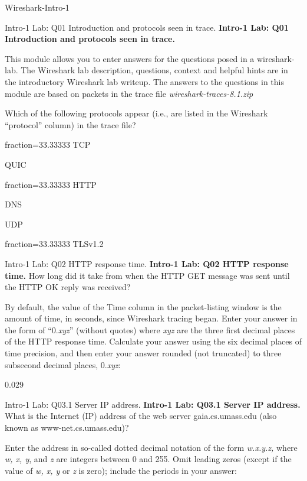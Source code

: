 \documentclass[a4paper]{article}
\begin{document}
\begin{quiz}{Wireshark-Intro-1}

\begin{multi}[points=1,multiple]{Intro-1 Lab: Q01 Introduction and protocols seen in trace.}
\textbf{Intro-1 Lab: Q01 Introduction and protocols seen in trace.}

This module allows you to enter answers for the questions posed in a wireshark-lab. The Wireshark lab description, questions, context and helpful hints are in the introductory Wireshark lab writeup. The answers to the questions in this module are based on packets in the trace file \emph{wireshark-traces-8.1.zip}

Which of the following protocols appear (i.e., are listed in the Wireshark ``protocol'' column) in the trace file? 

\item[fraction=33.33333] TCP
\item QUIC
\item[fraction=33.33333] HTTP
\item DNS
\item UDP
\item[fraction=33.33333] TLSv1.2
\end{multi}

\begin{shortanswer}[points=1]{Intro-1 Lab: Q02 HTTP response time.}
\textbf{Intro-1 Lab: Q02 HTTP response time.} 
How long did it take from when the HTTP GET message was sent until the HTTP OK reply was received? 

By default, the value of the Time column in the packet-listing window is the amount of time, in seconds, since Wireshark tracing began.  Enter your answer in the form of ``0.\emph{xyz}'' (without quotes) where \emph{xyz} are the three first decimal places of the HTTP response time. Calculate your answer using the six decimal places of time precision, and then enter your answer rounded (not truncated) to three subsecond decimal places, 0.\emph{xyz}:

\item 0.029
\end{shortanswer}

\begin{shortanswer}[points=1]{Intro-1 Lab: Q03.1 Server IP address.}
\textbf{Intro-1 Lab: Q03.1 Server IP address.} 
What is the Internet (IP) address of the web server gaia.cs.umass.edu (also known as www-net.cs.umass.edu)? 

Enter the address in so-called dotted decimal notation of the form \emph{w.x.y.z,} where  \emph{w, x, y}, and \emph{z} are integers between 0 and 255. Omit leading zeros (except if the value of \emph{w, x, y} or \emph{z} is zero); include the periods in your answer: 


\end{shortanswer}
\end{quiz}
\end{document}
